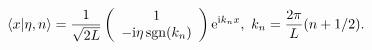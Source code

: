 \begin{equation}
\langle x| \eta ,n \rangle =\frac{1}{\sqrt{2L}}\left( \begin{array}{c} 1 \\ -{\rm i} \eta \,{\rm sgn}(k_n) \end{array}
\right){\rm e}^{{\rm i}k_n x}  ,  \ k_n = \frac{2\pi}{L} (n+1/2) .
\label{d3}
\end{equation}

